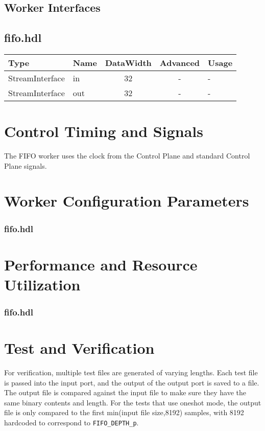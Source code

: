 \documentclass{article}
\def\comp{fifo}
\edef\ecomp{fifo}
\def\Comp{FIFO}
\begin{document}
\begin{landscape}
  \section*{Worker Interfaces}
  \subsection*{\comp.hdl}
  \begin{scriptsize}
    \begin{tabular}{|M{2cm}|M{1.5cm}|c|c|M{14.5cm}|}
      \hline
      Type            & Name & DataWidth & Advanced                & Usage                  \\
      \hline
      StreamInterface & in   & 32        & - & - \\
      \hline
      StreamInterface & out  & 32        & - & - \\
      \hline
    \end{tabular}
  \end{scriptsize}
\end{landscape}

\section*{Control Timing and Signals}
\begin{flushleft}
  The \Comp{} worker uses the clock from the Control Plane and standard Control Plane signals.
\end{flushleft}

\begin{landscape}
\section*{Worker Configuration Parameters}
\subsubsection*{\comp.hdl}

\section*{Performance and Resource Utilization}
\subsubsection*{\comp.hdl}

\end{landscape}

\section*{Test and Verification}
\begin{flushleft}
For verification, multiple test files are generated of varying lengths. Each test file is passed into the input port, and the output of the output port is saved to a file. The output file is compared against the input file to make sure they have the same binary contents and length. For the tests that use oneshot mode, the output file is only compared to the first min(input file size,8192) samples, with 8192 hardcoded to correspond to \verb+FIFO_DEPTH_p+.
\end{flushleft}
\end{document}
